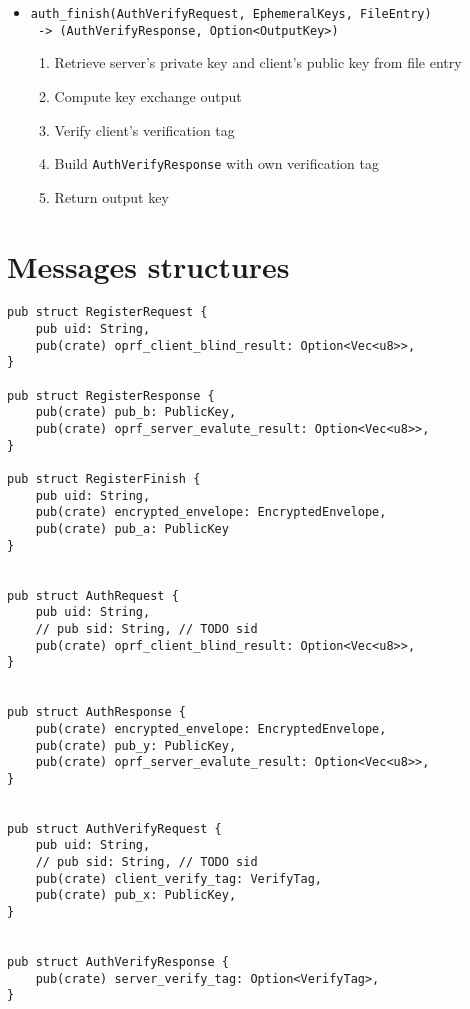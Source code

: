 \documentclass[../report.tex]{subfiles}
\begin{document}
\begin{itemize}
 \item \verb|auth_finish(AuthVerifyRequest, EphemeralKeys, FileEntry)|\\ 
       \verb| -> (AuthVerifyResponse, Option<OutputKey>)|
  \begin{enumerate}
    \item Retrieve server's private key and client's public key from file entry
    \item Compute key exchange output
    \item Verify client's verification tag
    \item Build \verb|AuthVerifyResponse| with own verification tag
    \item Return output key
  \end{enumerate}
  
\end{itemize}


\section{Messages structures}


\begin{verbatim}
pub struct RegisterRequest {
    pub uid: String,
    pub(crate) oprf_client_blind_result: Option<Vec<u8>>,
}

pub struct RegisterResponse {
    pub(crate) pub_b: PublicKey,
    pub(crate) oprf_server_evalute_result: Option<Vec<u8>>,
}

pub struct RegisterFinish {
    pub uid: String,
    pub(crate) encrypted_envelope: EncryptedEnvelope,
    pub(crate) pub_a: PublicKey
}


pub struct AuthRequest {
    pub uid: String,
    // pub sid: String, // TODO sid
    pub(crate) oprf_client_blind_result: Option<Vec<u8>>,
}


pub struct AuthResponse {
    pub(crate) encrypted_envelope: EncryptedEnvelope,
    pub(crate) pub_y: PublicKey,
    pub(crate) oprf_server_evalute_result: Option<Vec<u8>>,
}


pub struct AuthVerifyRequest {
    pub uid: String,
    // pub sid: String, // TODO sid
    pub(crate) client_verify_tag: VerifyTag,
    pub(crate) pub_x: PublicKey,
}


pub struct AuthVerifyResponse {
    pub(crate) server_verify_tag: Option<VerifyTag>,
}
\end{verbatim}

\end{document}
